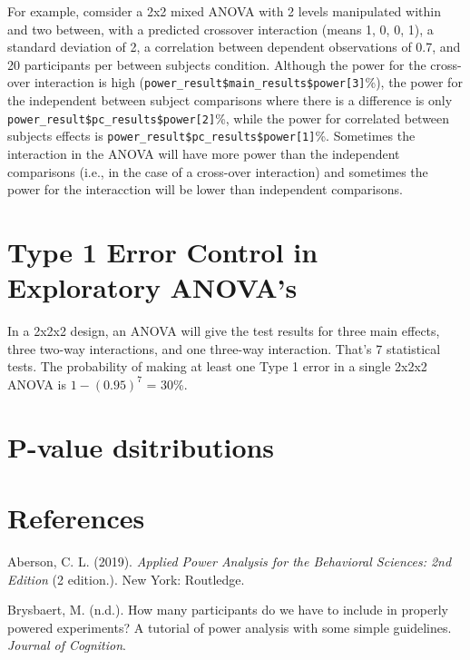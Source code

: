 \documentclass[,jou, draftfirst, a4paper,floatsintext]{apa6}
\begin{document}
For example, comsider a 2x2 mixed ANOVA with 2 levels manipulated within and two between, with a predicted crossover interaction (means 1, 0, 0, 1), a standard deviation of 2, a correlation between dependent observations of 0.7, and 20 participants per between subjects condition.
Although the power for the cross-over interaction is high (\texttt{power\_result\$main\_results\$power{[}3{]}}\%), the power for the independent between subject comparisons where there is a difference is only \texttt{power\_result\$pc\_results\$power{[}2{]}}\%, while the power for correlated between subjects effects is \texttt{power\_result\$pc\_results\$power{[}1{]}}\%.
Sometimes the interaction in the ANOVA will have more power than the independent comparisons (i.e., in the case of a cross-over interaction) and sometimes the power for the interacction will be lower than independent comparisons.

\hypertarget{type-1-error-control-in-exploratory-anovas}{%
\section{Type 1 Error Control in Exploratory ANOVA's}\label{type-1-error-control-in-exploratory-anovas}}

In a 2x2x2 design, an ANOVA will give the test results for three main effects, three two-way interactions, and one three-way interaction. That's 7 statistical tests. The probability of making at least one Type 1 error in a single 2x2x2 ANOVA is \(1-(0.95)^7\) = 30\%.

\hypertarget{p-value-dsitributions}{%
\section{P-value dsitributions}\label{p-value-dsitributions}}

\newpage

\hypertarget{references}{%
\section{References}\label{references}}

\setlength{\parindent}{-0.5in}
\setlength{\leftskip}{0.5in}

\hypertarget{refs}{}
\leavevmode\hypertarget{ref-aberson_applied_2019}{}%
Aberson, C. L. (2019). \emph{Applied Power Analysis for the Behavioral Sciences: 2nd Edition} (2 edition.). New York: Routledge.

\leavevmode\hypertarget{ref-brysbaert_how_nodate}{}%
Brysbaert, M. (n.d.). How many participants do we have to include in properly powered experiments? A tutorial of power analysis with some simple guidelines. \emph{Journal of Cognition}.
\end{document}

